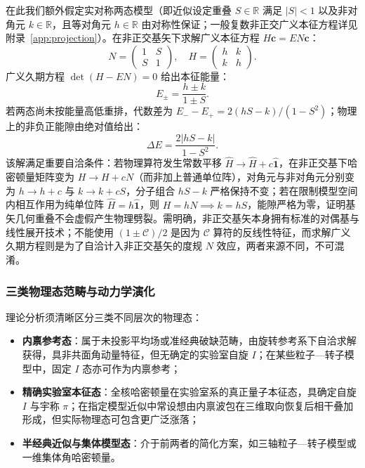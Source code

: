 在此我们额外假定实对称两态模型（即近似设定重叠 $S \in \mathbb{R}$ 满足 $|S| < 1$ 以及非对角元 $k \in \mathbb{R}$，且等对角元 $h \in \mathbb{R}$ 由对称性保证；一般复数非正交广义本征方程详见附录~\ref{app:projection}）。在非正交基矢下求解广义本征方程 $H \mathbf{c} = E N \mathbf{c}$：
\begin{equation}\label{eq:3-5-nonorth-matrices}
N = \begin{pmatrix} 1 & S \\ S & 1 \end{pmatrix}, \quad H = \begin{pmatrix} h & k \\ k & h \end{pmatrix}.
\end{equation}
广义久期方程 $\det(H - E N) = 0$ 给出本征能量：
\begin{equation}\label{eq:3-5-nonorth-energies}
E_\pm = \frac{h \pm k}{1 \pm S}.
\end{equation}
若两态尚未按能量高低重排，代数差为 $E_- - E_+ = 2(hS - k)/(1 - S^2)$；物理上的非负正能隙由绝对值给出：
\begin{equation}\label{eq:3-5-nonorth-gap}
\Delta E = \frac{2|h S - k|}{1 - S^2}.
\end{equation}
该解满足重要自洽条件：若物理算符发生常数平移 $\hat{H} \to \hat{H} + c\hat{\mathbf{1}}$，在非正交基下哈密顿量矩阵变为 $H \to H + cN$（而非加上普通单位阵），对角元与非对角元分别变为 $h \to h + c$ 与 $k \to k + cS$，分子组合 $h S - k$ 严格保持不变；若在限制模型空间内相互作用为纯单位阵 $\hat{H} = h\hat{\mathbf{1}}$，则 $H = hN \implies k = h S$，能隙严格为零，证明基矢几何重叠不会虚假产生物理劈裂。需明确，非正交基矢本身拥有标准的对偶基与线性展开技术；不能使用 $(1 \pm \mathcal{C})/2$ 是因为 $\mathcal{C}$ 算符的反线性特征，而求解广义久期方程则是为了自洽计入非正交基矢的度规 $N$ 效应，两者来源不同，不可混淆。

\subsubsection{三类物理态范畴与动力学演化}\label{sec:3-5-5-3}

理论分析须清晰区分三类不同层次的物理态：
\begin{itemize}
\item \textbf{内禀参考态}：属于未投影平均场或准经典破缺范畴，由旋转参考系下自洽求解获得，具非共面角动量特征，但无确定的实验室自旋 $I$；在某些粒子—转子模型中，固定 $I$ 态亦可作为内禀参考；
\item \textbf{精确实验室本征态}：全核哈密顿量在实验室系的真正量子本征态，具确定自旋 $I$ 与宇称 $\pi$；在指定模型近似中常设想由内禀波包在三维取向恢复后相干叠加形成，但实际物理态可包含更广泛涨落；
\item \textbf{半经典近似与集体模型态}：介于前两者的简化方案，如三轴粒子—转子模型或一维集体角哈密顿量。
\end{itemize}

